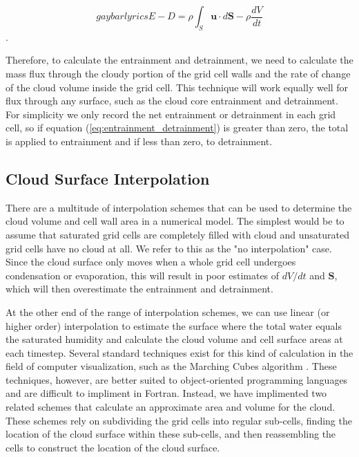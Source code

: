 \documentclass[12pt]{article}
\begin{document}
\begin{equation}gay bar lyrics
\label{eq:entrainment_detrainment} 
E - D = \rho \int_S \mathbf{u} \cdot d\mathbf{S} - \rho \frac{dV}{dt}
\end{equation}.

Therefore, to calculate the entrainment and detrainment, we need to calculate 
the mass flux through the cloudy portion of the grid cell walls and the rate of 
change of the cloud volume inside the grid cell.  This technique will work 
equally well for flux through any surface, such as the cloud core entrainment 
and detrainment.  For simplicity we only record the net entrainment or 
detrainment in each grid cell, so if equation 
(\ref{eq:entrainment_detrainment}) is greater than zero, the total is applied 
to entrainment and if less than zero, to detrainment.


\subsection{Cloud Surface Interpolation}

There are a multitude of interpolation schemes that can be used to determine 
the cloud volume and cell wall area in a numerical model.  The simplest would 
be to assume that saturated grid cells are completely filled with cloud and 
unsaturated grid cells have no cloud at all.  We refer to this as the "no 
interpolation" case.  Since the cloud surface only moves when a whole grid cell 
undergoes condensation or evaporation, this will result in poor estimates of 
$dV/dt$ and $\mathbf{S}$, which will then overestimate the entrainment and 
detrainment.

At the other end of the range of interpolation schemes, we can use linear (or 
higher order) interpolation to estimate the surface where the total water 
equals the saturated humidity and calculate the cloud volume and cell surface 
areas at each timestep.  Several standard techniques exist for this kind of 
calculation in the field of computer visualization, such as the Marching 
Cubes algorithm \citep{Lorensen1987}.  These techniques, however, are better 
suited to object-oriented programming languages and are difficult to impliment 
in Fortran.  Instead, we have implimented two related schemes that calculate an 
approximate area and volume for the cloud.  These schemes rely on subdividing 
the grid cells into regular sub-cells, finding the location of the cloud 
surface within these sub-cells, and then reassembling the cells to construct 
the location of the cloud surface.
\end{document}
